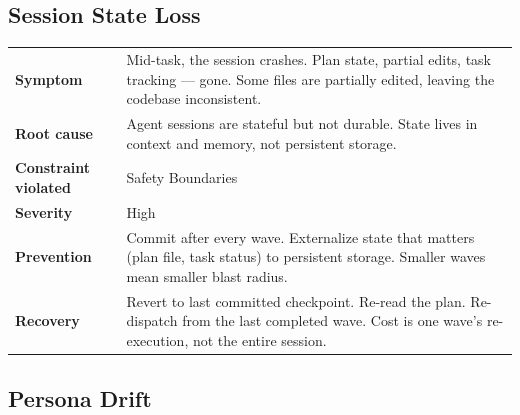 \documentclass[
  a4paper,
  DIV=11,
  numbers=noendperiod]{scrreprt}
\newcounter{none} %
\begin{document}
\subsection{Session State Loss}\label{session-state-loss}

{\def\LTcaptype{none} %
\begin{longtable}[]{@{}
  >{\raggedright\arraybackslash}p{}
  >{\raggedright\arraybackslash}p{}@{}}
\toprule\noalign{}
\endhead
\bottomrule\noalign{}
\endlastfoot
\textbf{Symptom} & Mid-task, the session crashes. Plan state, partial
edits, task tracking --- gone. Some files are partially edited, leaving
the codebase inconsistent. \\
\textbf{Root cause} & Agent sessions are stateful but not durable. State
lives in context and memory, not persistent storage. \\
\textbf{Constraint violated} & Safety Boundaries \\
\textbf{Severity} & High \\
\textbf{Prevention} & Commit after every wave. Externalize state that
matters (plan file, task status) to persistent storage. Smaller waves
mean smaller blast radius. \\
\textbf{Recovery} & Revert to last committed checkpoint. Re-read the
plan. Re-dispatch from the last completed wave. Cost is one wave's
re-execution, not the entire session. \\
\end{longtable}
}

\subsection{Persona Drift}\label{persona-drift}
\end{document}
